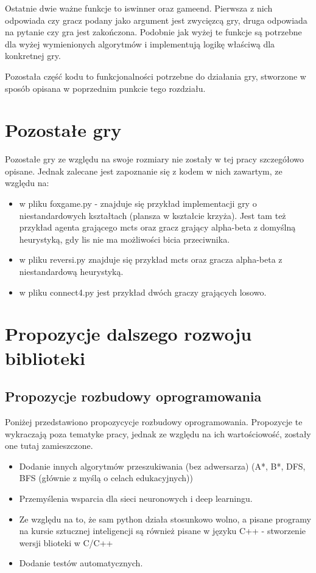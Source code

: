 \documentclass[polish,shortabstract,inz]{iithesis}
\begin{document}
Ostatnie dwie ważne funkcje to is\textunderscore winner oraz game\textunderscore end.
Pierwsza z nich odpowiada czy gracz podany jako argument jest zwycięzcą gry, druga odpowiada na pytanie czy gra jest zakończona.
Podobnie jak wyżej te funkcje są potrzebne dla wyżej wymienionych algorytmów i implementują logikę właściwą dla konkretnej gry.

Pozostała część kodu to funkcjonalności potrzebne do działania gry, stworzone w sposób opisana w poprzednim punkcie tego rozdziału.

\section{Pozostałe gry}
Pozostałe gry ze względu na swoje rozmiary nie zostały w tej pracy szczegółowo opisane.
Jednak zalecane jest zapoznanie się z kodem w nich zawartym, ze względu na:

\begin{itemize}
  \item w pliku fox\textunderscore game.py - znajduje się przykład implementacji gry o niestandardowych kształtach (plansza w kształcie krzyża). Jest tam też przykład agenta grającego mcts oraz gracz grający alpha-beta z domyślną heurystyką, gdy lis nie ma możliwości bicia przeciwnika.
  \item w pliku reversi.py znajduje się przykład mcts oraz gracza alpha-beta z niestandardową heurystyką.
  \item w pliku connect4.py jest przykład dwóch graczy grających losowo.
\end{itemize}

\section{Propozycje dalszego rozwoju biblioteki}
\subsection{Propozycje rozbudowy oprogramowania}
Poniżej przedstawiono propozycycje rozbudowy oprogramowania.
Propozycje te wykraczają poza tematyke pracy, jednak ze względu na ich wartościowość, zostały one tutaj zamieszczone.
\begin{itemize}
  \item Dodanie innych algorytmów przeszukiwania (bez adwersarza) (A*, B*, DFS, BFS (głównie z myślą o celach edukacyjnych))
  \item Przemyślenia wsparcia dla sieci neuronowych i deep learningu.
  \item Ze względu na to, że sam python działa stosunkowo wolno, a pisane programy na kursie sztucznej inteligencji są również pisane w języku C++ - stworzenie wersji blioteki w C/C++
  \item Dodanie testów automatycznych.
\end{itemize}
\end{document}
